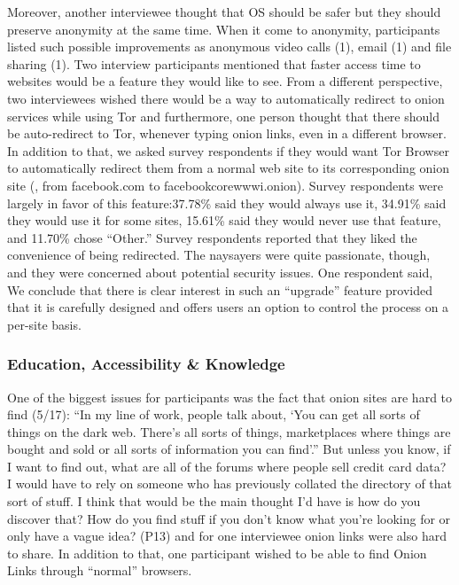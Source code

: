 Moreover, another interviewee thought that OS should be safer but they should
preserve anonymity at the same time. When it come to anonymity, participants
listed such possible improvements as anonymous video calls (1), email (1) and
file sharing (1). Two interview participants mentioned that faster access time
to websites would be a feature they would like to see. From a different
perspective, two interviewees wished there would be a way to automatically
redirect to onion services while using Tor and furthermore, one person thought
that there should be auto-redirect to Tor, whenever typing onion links, even in
a different browser. In addition to that, we asked survey respondents if they
would want Tor Browser to automatically redirect them from a normal web site to
its corresponding onion site (\eg, from facebook.com to facebookcorewwwi.onion).
Survey respondents were largely in favor of this feature:37.78\% said they would
always use it, 34.91\% said they would use it for some sites, 15.61\% said they
would never use that feature,   and 11.70\% chose ``Other.'' Survey respondents
reported that they liked the convenience of being redirected.  The naysayers
were quite passionate, though, and they were concerned about potential security
issues. One respondent said,   We conclude that there is clear
interest in such an ``upgrade'' feature provided that it is carefully designed
and offers users an option to control the process on a per-site basis.

\subsubsection{Education, Accessibility \& Knowledge}

One of the biggest issues for participants was the fact that onion sites are
hard to find (5/17): ``In my line of work, people talk about, `You can get all
sorts of things on the dark web. There's all sorts of things, marketplaces where
things are bought and sold or all sorts of information you can find'.'' But
unless you know, if I want to find out, what are all of the forums where people
sell credit card data? I would have to rely on someone who has previously
collated the directory of that sort of stuff. I think that would be the main
thought I'd have is how do you discover that? How do you find stuff if you don't
know what you're looking for or only have a vague idea? (P13) and for one
interviewee onion links were also hard to share.  In addition to that, one
participant wished to be able to find Onion Links through ``normal'' browsers.


